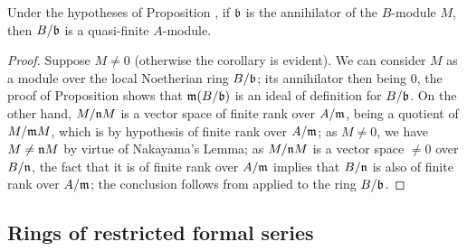 \begin{cor}[7.4.5]
\label{0.7.4.5}
Under the hypotheses of Proposition , if
$\mathfrak{b}$ is the annihilator of the $B$-module $M$, then $B/\mathfrak{b}$ is a
quasi-finite $A$-module.
\end{cor}

\begin{proof}
\label{proof-0.7.4.5}
Suppose $M\neq 0$ (otherwise the corollary is evident). We can consider $M$ as a
module over the local Noetherian ring $B/\mathfrak{b}$; its annihilator then being
$0$, the proof of Proposition  shows that
$\mathfrak{m}(B/\mathfrak{b})$ is an ideal of definition for $B/\mathfrak{b}$.
On the other hand, $M/\mathfrak{n}M$ is a vector space of finite rank over
$A/\mathfrak{m}$, being a quotient of $M/\mathfrak{m}M$, which is by hypothesis of
finite rank over $A/\mathfrak{m}$; as $M\neq 0$, we have $M\neq\mathfrak{n}M$ by
virtue of Nakayama's Lemma; as $M/\mathfrak{n}M$ is a vector space $\neq 0$ over
$B/\mathfrak{n}$, the fact that it is of finite rank over $A/\mathfrak{m}$ implies
that $B/\mathfrak{n}$ is also of finite rank over $A/\mathfrak{m}$; the conclusion
follows from  applied to the ring $B/\mathfrak{b}$.
\end{proof}

\subsection{Rings of restricted formal series}
\label{subsection:rings-of-restricted-formal-series}

